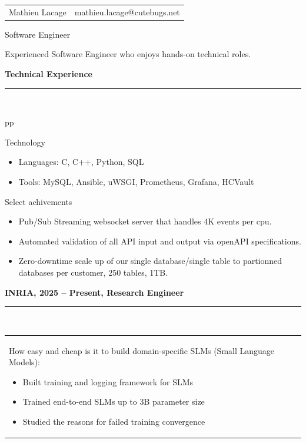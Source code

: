 \documentclass[a4paper,12pt]{article}
\newcommand{\ligne}[1]{\rule[0.5ex]{\textwidth}{#1}\\}
\newcommand{\styleRub}[1]{\textbf{\large #1}\par}
\newcommand{\indentStd}{\noindent\hspace*{10pt}}
\newenvironment{rubrique}[2][\linewidth]%
{\styleRub{#2}%
\ligne{0.5mm}
\setlength{\lenB}{#1}%
\setlength{\lenC}{\linewidth}%
\addtolength{\lenC}{-\lenA}%
\addtolength{\lenC}{-\lenB}%
\addtolength{\lenC}{-19pt}
\indentStd\begin{tabular}[t]{p{\lenB}p{\lenC}}}
{\end{tabular}}
\newlength{\lenA} %
\newlength{\lenB} %
\newlength{\lenC} %
\begin{document}
\begin{tabular*}{1\textwidth}{@{\extracolsep{\fill}}lr}
Mathieu Lacage & mathieu.lacage@cutebugs.net\\
\end{tabular*}

\vspace{1cm}
\begin{center}{\huge Software Engineer}\end{center}

\begin{center}
Experienced Software Engineer who enjoys hands-on technical roles.\newline
\end{center}

\vspace{1cm}
\begin{rubrique}{Technical Experience}

Technology
\begin{itemize}
\item Languages: C, C++, Python, SQL
\item Tools: MySQL, Ansible, uWSGI, Prometheus, Grafana, HCVault
\end{itemize}

Select achivements 
\begin{itemize}
\item Pub/Sub Streaming websocket server that handles 4K events per cpu.
\item Automated validation of all API input and output via openAPI specifications.
\item Zero-downtime scale up of our single database/single table to partionned
 databases per customer, 250 tables, 1TB.
\end{itemize}

\end{rubrique}

\vspace{0.5cm}
\begin{rubrique}{INRIA, 2025 -- Present, Research Engineer}

How easy and cheap is it to build domain-specific
SLMs (Small Language Models):
\begin{itemize}
\item Built training and logging framework for SLMs
\item Trained end-to-end SLMs up to 3B parameter size
\item Studied the reasons for failed training convergence
\end{itemize}

\end{rubrique}
\pagebreak
\end{document}
